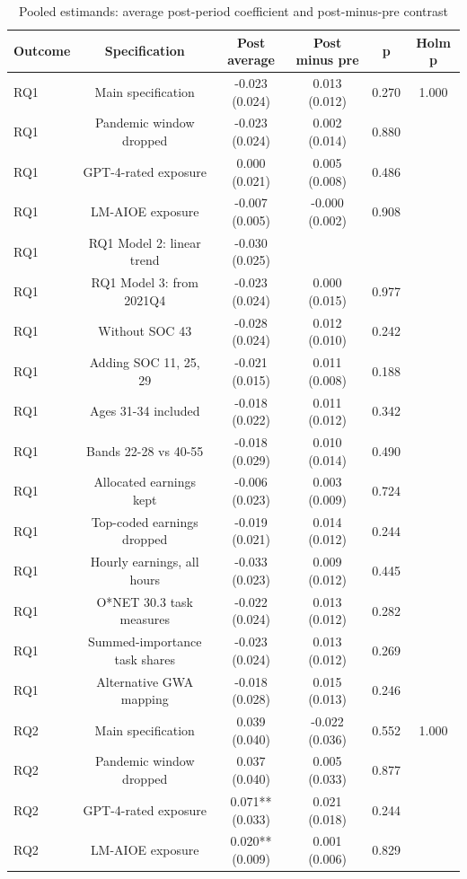 \begin{table}[htbp]\centering
\caption{Pooled estimands: average post-period coefficient and post-minus-pre contrast}
\begin{tabular}{lccccc}
\toprule
Outcome & Specification & Post average & Post minus pre & p & Holm p \\
\midrule
RQ1 & Main specification & -0.023 (0.024) & 0.013 (0.012) & 0.270 & 1.000 \\
RQ1 & Pandemic window dropped & -0.023 (0.024) & 0.002 (0.014) & 0.880 &  \\
RQ1 & GPT-4-rated exposure & 0.000 (0.021) & 0.005 (0.008) & 0.486 &  \\
RQ1 & LM-AIOE exposure & -0.007 (0.005) & -0.000 (0.002) & 0.908 &  \\
RQ1 & RQ1 Model 2: linear trend & -0.030 (0.025) &  &  &  \\
RQ1 & RQ1 Model 3: from 2021Q4 & -0.023 (0.024) & 0.000 (0.015) & 0.977 &  \\
RQ1 & Without SOC 43 & -0.028 (0.024) & 0.012 (0.010) & 0.242 &  \\
RQ1 & Adding SOC 11, 25, 29 & -0.021 (0.015) & 0.011 (0.008) & 0.188 &  \\
RQ1 & Ages 31-34 included & -0.018 (0.022) & 0.011 (0.012) & 0.342 &  \\
RQ1 & Bands 22-28 vs 40-55 & -0.018 (0.029) & 0.010 (0.014) & 0.490 &  \\
RQ1 & Allocated earnings kept & -0.006 (0.023) & 0.003 (0.009) & 0.724 &  \\
RQ1 & Top-coded earnings dropped & -0.019 (0.021) & 0.014 (0.012) & 0.244 &  \\
RQ1 & Hourly earnings, all hours & -0.033 (0.023) & 0.009 (0.012) & 0.445 &  \\
RQ1 & O*NET 30.3 task measures & -0.022 (0.024) & 0.013 (0.012) & 0.282 &  \\
RQ1 & Summed-importance task shares & -0.023 (0.024) & 0.013 (0.012) & 0.269 &  \\
RQ1 & Alternative GWA mapping & -0.018 (0.028) & 0.015 (0.013) & 0.246 &  \\
RQ2 & Main specification & 0.039 (0.040) & -0.022 (0.036) & 0.552 & 1.000 \\
RQ2 & Pandemic window dropped & 0.037 (0.040) & 0.005 (0.033) & 0.877 &  \\
RQ2 & GPT-4-rated exposure & 0.071** (0.033) & 0.021 (0.018) & 0.244 &  \\
RQ2 & LM-AIOE exposure & 0.020** (0.009) & 0.001 (0.006) & 0.829 &  \\

\end{tabular}
\end{table}
